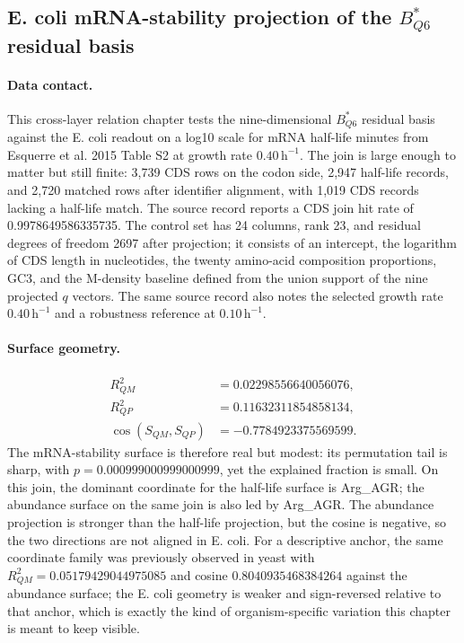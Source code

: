 \subsection{E. coli mRNA-stability projection of the $B^\ast_{Q6}$ residual basis}
\label{sec:ecoli-bstarq6-mrna-stability-sqm-codon-optimality}

\paragraph{Data contact.} This cross-layer relation chapter tests the nine-dimensional $B^\ast_{Q6}$ residual basis against the E. coli readout on a log10 scale for mRNA half-life minutes from Esquerre et al. 2015 Table S2 at growth rate $0.40\,\mathrm{h}^{-1}$. The join is large enough to matter but still finite: 3{,}739 CDS rows on the codon side, 2{,}947 half-life records, and 2{,}720 matched rows after identifier alignment, with 1{,}019 CDS records lacking a half-life match. The source record reports a CDS join hit rate of 0.9978649586335735. The control set has 24 columns, rank 23, and residual degrees of freedom 2697 after projection; it consists of an intercept, the logarithm of CDS length in nucleotides, the twenty amino-acid composition proportions, GC3, and the M-density baseline defined from the union support of the nine projected $q$ vectors. The same source record also notes the selected growth rate $0.40\,\mathrm{h}^{-1}$ and a robustness reference at $0.10\,\mathrm{h}^{-1}$.

\paragraph{Surface geometry.} $$\begin{aligned}
R^2_{QM} &= 0.02298556640056076, \\
R^2_{QP} &= 0.11632311854858134, \\
\cos(S_{QM}, S_{QP}) &= -0.7784923375569599.
\end{aligned}$$
The mRNA-stability surface is therefore real but modest: its permutation tail is sharp, with $p=0.000999000999000999$, yet the explained fraction is small. On this join, the dominant coordinate for the half-life surface is Arg\_AGR; the abundance surface on the same join is also led by Arg\_AGR. The abundance projection is stronger than the half-life projection, but the cosine is negative, so the two directions are not aligned in E. coli. For a descriptive anchor, the same coordinate family was previously observed in yeast with $R^2_{QM}=0.05179429044975085$ and cosine $0.8040935468384264$ against the abundance surface; the E. coli geometry is weaker and sign-reversed relative to that anchor, which is exactly the kind of organism-specific variation this chapter is meant to keep visible.

